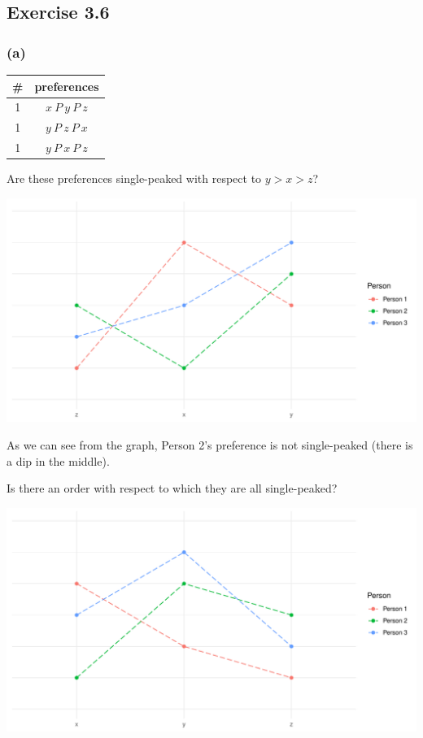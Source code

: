 \documentclass[a4paper]{article}
\begin{document}
\subsection*{Exercise 3.6}

\subsubsection*{(a)}

\begin{table}[!htbp]
    \centering
    \begin{tabular}{c|c|}
        \# & preferences         \\ 
        \hline
        1  & $x\: P\: y\: P\: z$ \\
        1  & $y\: P\: z\: P\: x$ \\
        1  & $y\: P\: x\: P\: z$ \\
        \hline
    \end{tabular}
\end{table}

Are these preferences single-peaked with respect to $y>x>z$?
\begin{center}
    \includegraphics[scale=0.5]{images/Ex3.6(a)1.pdf}
\end{center}

As we can see from the graph, Person 2's preference is not single-peaked (there is a dip in the middle).

Is there an order with respect to which they are all single-peaked?
\begin{center}
    \includegraphics[scale=0.5]{images/Ex3.6(a)2.pdf}
\end{center}
\end{document}
